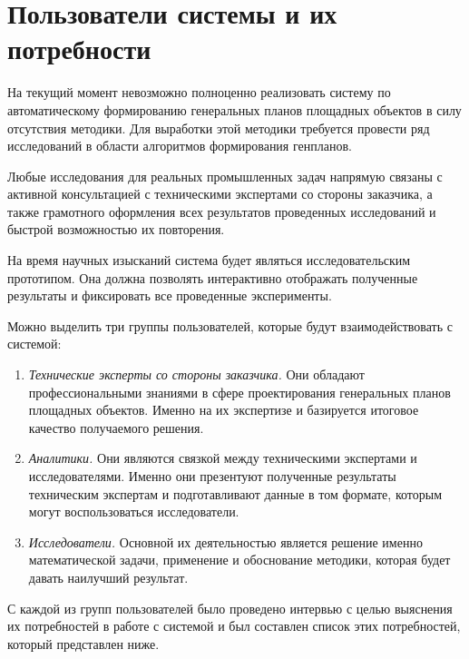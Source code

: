 \section{\Large{Пользователи системы и их потребности}}

На текущий момент невозможно полноценно реализовать систему по автоматическому
формированию генеральных планов площадных объектов в силу отсутствия методики.
Для выработки этой методики требуется провести ряд исследований в области
алгоритмов формирования генпланов.

Любые исследования для реальных промышленных задач напрямую связаны с активной консультацией с техническими
экспертами со стороны заказчика, а также грамотного оформления всех результатов проведенных исследований
и быстрой возможностью их повторения.

На время научных изысканий система будет являться исследовательским прототипом.
Она должна позволять интерактивно отображать полученные результаты и фиксировать все проведенные эксперименты.

Можно выделить три группы пользователей, которые будут взаимодействовать с системой:
\begin{enumerate}
    \item {
        \textit{Технические эксперты со стороны заказчика.} Они обладают профессиональными знаниями в сфере
        проектирования генеральных планов площадных объектов. Именно на их экспертизе и базируется итоговое
        качество получаемого решения.
    }
    \item{
        \textit{Аналитики.} Они являются связкой между техническими экспертами и исследователями.
        Именно они презентуют полученные результаты техническим экспертам и подготавливают данные в том формате,
        которым могут воспользоваться исследователи.
    }
    \item{
        \textit{Исследователи.} Основной их деятельностью является решение именно математической задачи,
        применение и обоснование методики, которая будет давать наилучший результат.
    }
\end{enumerate}

С каждой из групп пользователей было проведено интервью с целью выяснения их потребностей в работе с системой
и был составлен список этих потребностей, который представлен ниже.

